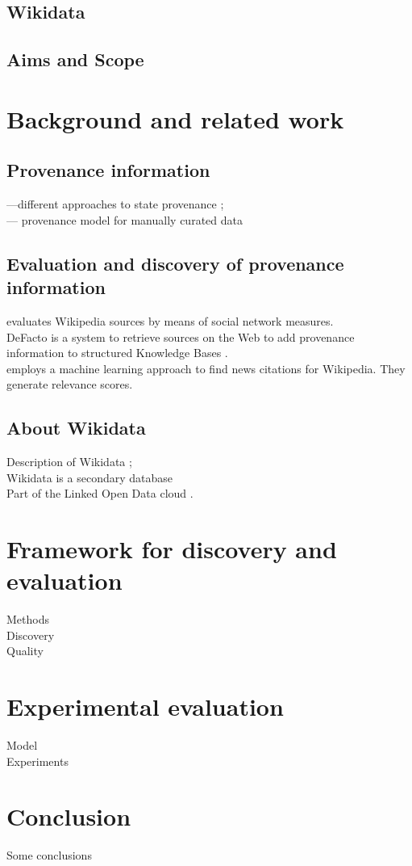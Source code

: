 \documentclass{llncs}
\begin{document}
\subsection{Wikidata}

\subsection{Aims and Scope}


%
\section{Background and related work}
%
\subsection{Provenance information}
---different approaches to state provenance \cite{DBLP:conf/btw/GlavicD07};\\
--- provenance model for manually curated data \cite{DBLP:conf/ipaw/BunemanCCV06}

\subsection{Evaluation and discovery of provenance information}
\cite{DBLP:journals/oir/KorfiatisPB06} evaluates Wikipedia sources by means of social network measures.\\
DeFacto is a system to retrieve sources on the Web to add provenance information to structured Knowledge Bases \cite{DBLP:conf/semweb/LehmannGMN12}.\\
\cite{DBLP:conf/cikm/FetahuMNA16} employs a machine learning approach to find news citations for Wikipedia. They generate relevance scores.

\subsection{About Wikidata}
Description of Wikidata \cite{DBLP:journals/cacm/VrandecicK14};\\
Wikidata is a secondary database\\
Part of the Linked Open Data cloud \cite{DBLP:conf/semweb/ErxlebenGKMV14}.

\section{Framework for discovery and evaluation}
Methods\\
Discovery\\
    Quality
    
\section{Experimental evaluation}
    Model\\
    Experiments
    
\section{Conclusion}
Some conclusions

%
%
\nocite{*}


\end{document}
